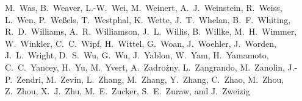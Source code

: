 {M.~Was, %
B.~Weaver,  %
L.-W.~Wei, %
M.~Weinert,  %
A.~J.~Weinstein,  %
R.~Weiss,  %
L.~Wen,  %
P.~We{\ss}els,  %
T.~Westphal,  %
K.~Wette,  %
J.~T.~Whelan,  %
B.~F.~Whiting,  %
R.~D.~Williams,  %
A.~R.~Williamson,  %
J.~L.~Willis,  %
B.~Willke,  %
M.~H.~Wimmer,  %
W.~Winkler,  %
C.~C.~Wipf,  %
H.~Wittel,  %
G.~Woan,  %
J.~Woehler,  %
J.~Worden,  %
J.~L.~Wright,  %
D.~S.~Wu,  %
G.~Wu,  %
J.~Yablon,  %
W.~Yam,  %
H.~Yamamoto,  %
C.~C.~Yancey,  %
H.~Yu,  %
M.~Yvert, %
A.~Zadro\.zny, %
L.~Zangrando, %
M.~Zanolin,  %
J.-P.~Zendri, %
M.~Zevin,  %
L.~Zhang,  %
M.~Zhang,  %
Y.~Zhang,  %
C.~Zhao,  %
M.~Zhou,  %
Z.~Zhou,  %
X.~J.~Zhu,  %
M.~E.~Zucker,  %
S.~E.~Zuraw,  %
and
J.~Zweizig}  %

\medskip
{}%
\medskip

